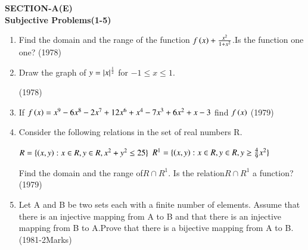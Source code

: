 \documentclass[journal,12pt,twocolumn]{IEEEtran}
\theoremstyle{remark}
\begin{document}
\begin{center}
    \item 
      \textbf{SECTION-A(E)\\Subjective Problems(1-5)}
\end{center}
\begin{enumerate}[start=1]
\item Find the domain and the range of the function $f\left(x\right)+\frac{x^2}{1+x^2}$.Is the function one one? 
\hfill(1978)
\item Draw the graph of $y=\left\vert x\right\vert^{\frac{1}{2}}$ for $-1\le x \le1.$

\hfill(1978)
\item If $f\left(x\right)=x^9-6x^8-2x^7+12x^6+x^4-7x^3+6x^2+x-3$ find $f\left(x\right)$
\hfill(1979)
\item Consider the following relations in the set of real numbers R.

$R=\{\left(x,y\right):x\in R,y\in R,x^2+y^2\le25\}$
$R^1=\{\left(x,y\right):x\in R,y\in R,y\ge\frac{4}{9}x^2\}$

Find the domain and the range of$ R\cap R^1.$ Is the relation$ R\cap R^1$ a function? 
\hfill(1979)
\item Let A and B be two sets each with a finite number of elements. Assume that there is an injective mapping from A to B and that there is an injective mapping from B to A.Prove that there is a bijective mapping from A to B.
\hfill(1981-2Marks)
\end{enumerate}
\end{document}
